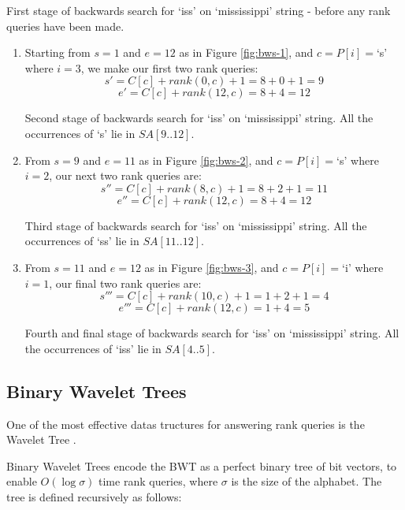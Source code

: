 \clearpage			
			{First stage of backwards search for `iss' on `mississippi'
			 string - before any rank queries have been made.}

\begin{enumerate}
	\item
		Starting from $s = 1$ and $e = 12$ as in Figure \ref{fig:bws-1},
		and $c = P[i] = $`s' where $i = 3$, we make our first two rank queries:
			$$s' = C[c] + rank(0, c) + 1 = 8 + 0 + 1 = 9$$
			$$e' = C[c] + rank(12, c) = 8 + 4 = 12$$
		
				{Second stage of backwards search for `iss' on `mississippi'
				string. All the occurrences of `s' lie in $SA[9..12]$.}
\clearpage				
	\item
		From $s = 9$ and $e = 11$ as in Figure \ref{fig:bws-2},
		and $c = P[i] = $`s' where $i = 2$, our next two rank queries are:
			$$s'' = C[c] + rank(8, c) + 1 = 8 + 2 + 1 = 11$$
			$$e'' = C[c] + rank(12, c) = 8 + 4 = 12$$
	
			
				{Third stage of backwards search for `iss' on `mississippi'
				string. All the occurrences of `ss' lie in $SA[11..12]$.}
	
	\item
		From $s = 11$ and $e = 12$ as in Figure \ref{fig:bws-3},
		and $c = P[i] = $`i' where $i = 1$, our final two rank queries are:
			$$s''' = C[c] + rank(10, c) + 1 = 1 + 2 + 1 = 4$$
			$$e''' = C[c] + rank(12, c) = 1 + 4 = 5$$
			
			
				{Fourth and final stage of backwards search for `iss' on
				`mississippi' string. All the occurrences of `iss' lie in
				$SA[4..5]$.}
				
\end{enumerate}

\clearpage
\subsection{Binary Wavelet Trees}
One of the most effective datas tructures for answering rank queries is the Wavelet Tree \cite{claude2008, FGM09, ferragina07, GGV03, MN07:selfindex}.

Binary Wavelet Trees encode the BWT as a perfect binary tree of bit vectors, to 
enable $O(\log \sigma)$ time rank queries, where $\sigma$ is the size of the alphabet. The tree is defined recursively as follows:

